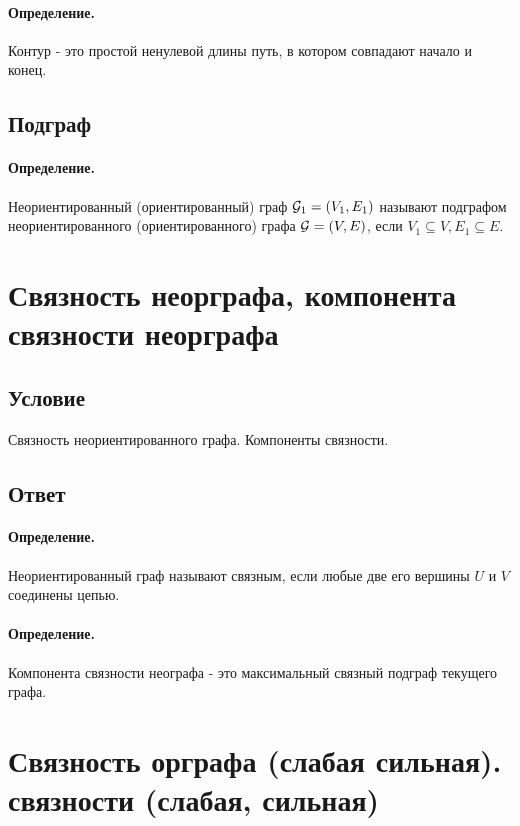 \documentclass{report}
\begin{document}
\paragraph*{Определение.}
Контур - это простой ненулевой длины путь, в котором совпадают начало и конец.

\subsection{Подграф}
\paragraph*{Определение.}
Неориентированный (ориентированный) граф $ {\cal G}_1 = (V_1, E_1)$ называют подграфом
неориентированного (ориентированного) графа $ {\cal G} = (V, E)$, если
$V_1 \subseteq V, E_1 \subseteq E$.

\newpage

\section{Связность неорграфа, компонента связности неорграфа}
\subsection{Условие}
Связность неориентированного графа. Компоненты
связности.

\subsection{Ответ}

\paragraph*{Определение.}
Неориентированный граф называют связным, если любые две его вершины $U$ и  $V$ соединены цепью.

 \paragraph*{Определение.}
Компонента связности неографа - это максимальный связный подграф текущего графа.

\newpage

\section{Связность орграфа (слабая сильная).
 связности (слабая, сильная)}
\end{document}
